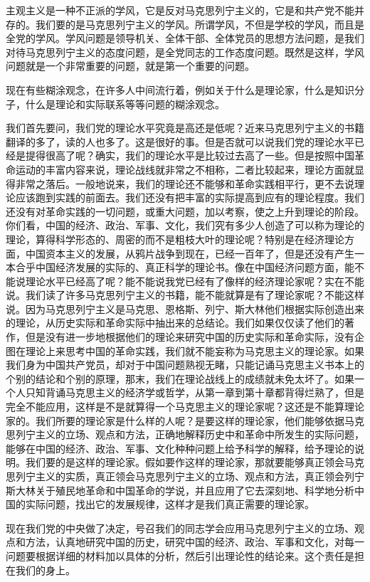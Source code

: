主观主义是一种不正派的学风，它是反对马克思列宁主义的，它是和共产党不能并存的。我们要的是马克思列宁主义的学风。所谓学风，不但是学校的学风，而且是全党的学风。学风问题是领导机关、全体干部、全体党员的思想方法问题，是我们对待马克思列宁主义的态度问题，是全党同志的工作态度问题。既然是这样，学风问题就是一个非常重要的问题，就是第一个重要的问题。

现在有些糊涂观念，在许多人中间流行着，例如关于什么是理论家，什么是知识分子，什么是理论和实际联系等等问题的糊涂观念。

我们首先要问，我们党的理论水平究竟是高还是低呢？近来马克思列宁主义的书籍翻译的多了，读的人也多了。这是很好的事。但是否就可以说我们党的理论水平已经是提得很高了呢？确实，我们的理论水平是比较过去高了一些。但是按照中国革命运动的丰富内容来说，理论战线就非常之不相称，二者比较起来，理论方面就显得非常之落后。一般地说来，我们的理论还不能够和革命实践相平行，更不去说理论应该跑到实践的前面去。我们还没有把丰富的实际提高到应有的理论程度。我们还没有对革命实践的一切问题，或重大问题，加以考察，使之上升到理论的阶段。你们看，中国的经济、政治、军事、文化，我们究有多少人创造了可以称为理论的理论，算得科学形态的、周密的而不是粗枝大叶的理论呢？特别是在经济理论方面，中国资本主义的发展，从鸦片战争到现在，已经一百年了，但是还没有产生一本合乎中国经济发展的实际的、真正科学的理论书。像在中国经济问题方面，能不能说理论水平已经高了呢？能不能说我党已经有了像样的经济理论家呢？实在不能说。我们读了许多马克思列宁主义的书籍，能不能就算是有了理论家呢？不能这样说。因为马克思列宁主义是马克思、恩格斯、列宁、斯大林他们根据实际创造出来的理论，从历史实际和革命实际中抽出来的总结论。我们如果仅仅读了他们的著作，但是没有进一步地根据他们的理论来研究中国的历史实际和革命实际，没有企图在理论上来思考中国的革命实践，我们就不能妄称为马克思主义的理论家。如果我们身为中国共产党员，却对于中国问题熟视无睹，只能记诵马克思主义书本上的个别的结论和个别的原理，那末，我们在理论战线上的成绩就未免太坏了。如果一个人只知背诵马克思主义的经济学或哲学，从第一章到第十章都背得烂熟了，但是完全不能应用，这样是不是就算得一个马克思主义的理论家呢？这还是不能算理论家的。我们所要的理论家是什么样的人呢？是要这样的理论家，他们能够依据马克思列宁主义的立场、观点和方法，正确地解释历史中和革命中所发生的实际问题，能够在中国的经济、政治、军事、文化种种问题上给予科学的解释，给予理论的说明。我们要的是这样的理论家。假如要作这样的理论家，那就要能够真正领会马克思列宁主义的实质，真正领会马克思列宁主义的立场、观点和方法，真正领会列宁斯大林关于殖民地革命和中国革命的学说，并且应用了它去深刻地、科学地分析中国的实际问题，找出它的发展规律，这样才是我们真正需要的理论家。

现在我们党的中央做了决定，号召我们的同志学会应用马克思列宁主义的立场、观点和方法，认真地研究中国的历史，研究中国的经济、政治、军事和文化，对每一问题要根据详细的材料加以具体的分析，然后引出理论性的结论来。这个责任是担在我们的身上。


